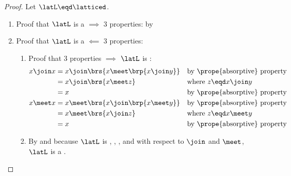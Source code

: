 \begin{proof}
Let $\latL\eqd\latticed$.
\begin{enumerate}
  \item Proof that $\latL$ is a  $\implies$ 3 properties:
    by 

  \item Proof that $\latL$ is a  $\impliedby$ 3 properties:
    \begin{enumerate}
      \item Proof that 3 properties $\implies$ $\latL$ is :
        \begin{align*}
          x \join x
            &= x \join \brs{x \meet\brp{x\join y}}
            && \text{by \prope{absorptive} property}
          \\&= x \join \brs{x \meet z}
            && \text{where $z\eqd x\join y$}
          \\&= x
            && \text{by \prope{absorptive} property}
          \\
          x \meet x
            &= x \meet \brs{x \join\brp{x\meet y}}
            && \text{by \prope{absorptive} property}
          \\&= x \meet \brs{x \join z}
            && \text{where $z\eqd x\meet y$}
          \\&= x
            && \text{by \prope{absorptive} property}
        \end{align*}

      \item By  and because $\latL$ is 
            , , , and 
            with respect to $\join$ and $\meet$,
            $\latL$ is a .
    \end{enumerate}
\end{enumerate}
\end{proof}


